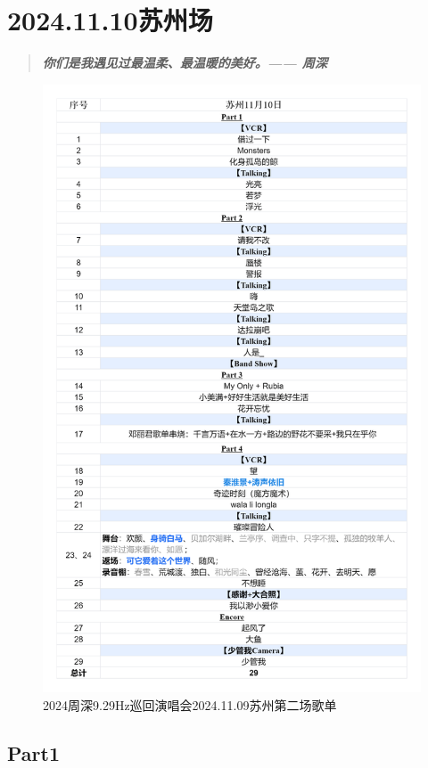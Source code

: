 \documentclass[]{ctexbook}
\begin{document}
\chapter{2024.11.10苏州场}\label{suzhou-20241110}

\begin{quote}
\textbf{\emph{你们是我遇见过最温柔、最温暖的美好。------ 周深}}
\end{quote}

\begin{figure}

{\centering \includegraphics[width=320pt]{img/playlists/playlists-suzhou-20241110} 

}

\caption{2024周深9.29Hz巡回演唱会2024.11.09苏州第二场歌单}\label{fig:unnamed-chunk-134}
\end{figure}

\newpage

\section{Part1}\label{suzhou-20241110-part1}
\end{document}
